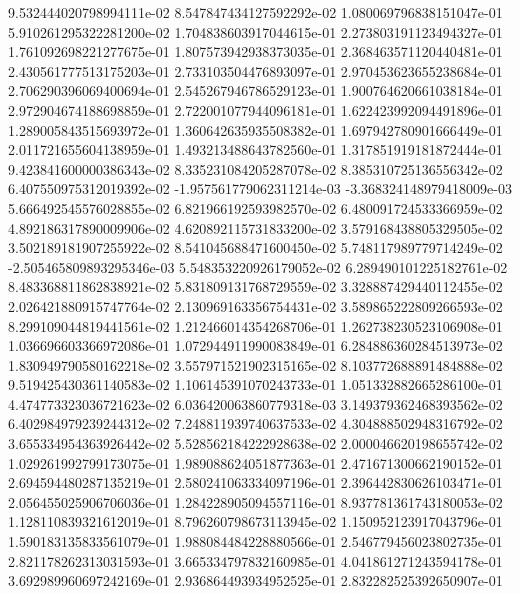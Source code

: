 9.532444020798994111e-02	8.547847434127592292e-02	1.080069796838151047e-01	5.910261295322281200e-02	1.704838603917044615e-01	2.273803191123494327e-01	1.761092698221277675e-01	1.807573942938373035e-01	2.368463571120440481e-01	2.430561777513175203e-01	2.733103504476893097e-01	2.970453623655238684e-01	2.706290396069400694e-01	2.545267946786529123e-01	1.900764620661038184e-01	2.972904674188698859e-01	2.722001077944096181e-01	1.622423992094491896e-01	1.289005843515693972e-01	1.360642635935508382e-01	1.697942780901666449e-01	2.011721655604138959e-01	1.493213488643782560e-01	1.317851919181872444e-01	9.423841600000386343e-02	8.335231084205287078e-02	8.385310725136556342e-02	6.407550975312019392e-02	-1.957561779062311214e-03	-3.368324148979418009e-03	5.666492545576028855e-02	6.821966192593982570e-02	6.480091724533366959e-02	4.892186317890009906e-02	4.620892115731833200e-02	3.579168438805329505e-02	3.502189181907255922e-02	8.541045688471600450e-02	5.748117989779714249e-02	-2.505465809893295346e-03	5.548353220926179052e-02	6.289490101225182761e-02	8.483368811862838921e-02	5.831809131768729559e-02	3.328887429440112455e-02	2.026421880915747764e-02	2.130969163356754431e-02	3.589865222809266593e-02	8.299109044819441561e-02	1.212466014354268706e-01	1.262738230523106908e-01	1.036696603366972086e-01	1.072944911990083849e-01	6.284886360284513973e-02	1.830949790580162218e-02	3.557971521902315165e-02	8.103772688891484888e-02	9.519425430361140583e-02	1.106145391070243733e-01	1.051332882665286100e-01	4.474773323036721623e-02	6.036420063860779318e-03	3.149379362468393562e-02	6.402984979239244312e-02	7.248811939740637533e-02	4.304888502948316792e-02	3.655334954363926442e-02	5.528562184222928638e-02	2.000046620198655742e-02	1.029261992799173075e-01	1.989088624051877363e-01	2.471671300662190152e-01	2.694594480287135219e-01	2.580241063334097196e-01	2.396442830626103471e-01	2.056455025906706036e-01	1.284228905094557116e-01	8.937781361743180053e-02	1.128110839321612019e-01	8.796260798673113945e-02	1.150952123917043796e-01	1.590183135833561079e-01	1.988084484228880566e-01	2.546779456023802735e-01	2.821178262313031593e-01	3.665334797832160985e-01	4.041861271243594178e-01	3.692989960697242169e-01	2.936864493934952525e-01	2.832282525392650907e-01

